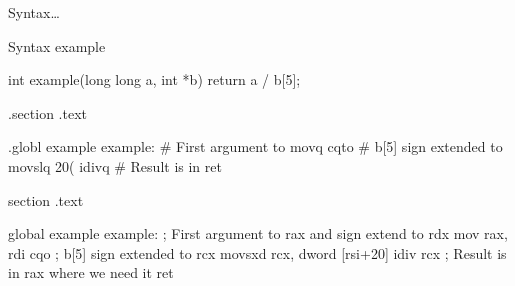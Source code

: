 \begin{slide}{Syntax\dots}{}
  \begin{nicscolumn*}{0.7cm}{1.5cm}{7cm}
  \end{nicscolumn*}
  \begin{nicscolumn*}{8.3cm}{1.5cm}{7.5cm}
    \nicspar{}
  \end{nicscolumn*}
\end{slide}

\begin{slide}{Syntax example}{}
  \begin{nicscolumn*}{4cm}{1.5cm}{8cm}
    \begin{nicsextern}[width=5cm]{}
      int example(long long a, int *b) {
        return a / b[5];
      }
    \end{nicsextern}
  \end{nicscolumn*}
  \begin{nicscolumn*}{0.7cm}{3cm}{7cm}
    \begin{nicsextern}[height=3.7cm]{}
      .section .text

      .globl example
      example:
        # First argument to %
        movq    %
        cqto
        # b[5] sign extended to %
        movslq  20(%
        idivq   %
        # Result is in %
        ret
    \end{nicsextern}
  \end{nicscolumn*}
  \begin{nicscolumn*}{8.3cm}{3cm}{7.5cm}
    \begin{nicsextern}[height=3.7cm]{}
      section .text

      global example
      example:
        ; First argument to rax and sign extend to rdx
        mov    rax, rdi
        cqo
        ; b[5] sign extended to rcx
        movsxd rcx, dword [rsi+20]
        idiv   rcx
        ; Result is in rax where we need it
        ret
    \end{nicsextern}
  \end{nicscolumn*}
\end{slide}

